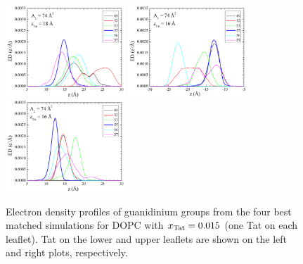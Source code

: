 \begin{figure}[htbp]
  \includegraphics[width=0.4\textwidth]{figures/Tat/MD_Results/guanidinium/dopc-tat2_guan_74-0_R}
  \includegraphics[width=0.4\textwidth]{figures/Tat/MD_Results/guanidinium/dopc-tat2_guan_74-1_L}
  \includegraphics[width=0.4\textwidth]{figures/Tat/MD_Results/guanidinium/dopc-tat2_guan_74-1_R}
  \caption{Electron density profiles of guanidinium groups 
  from the four best matched simulations for DOPC with $x_\textrm{Tat} = 0.015$ 
  (one Tat on each leaflet). Tat on the lower and upper leaflets
  are shown on the left and right plots, respectively.}
  \label{fig:MD_guanidinium}
\end{figure}


